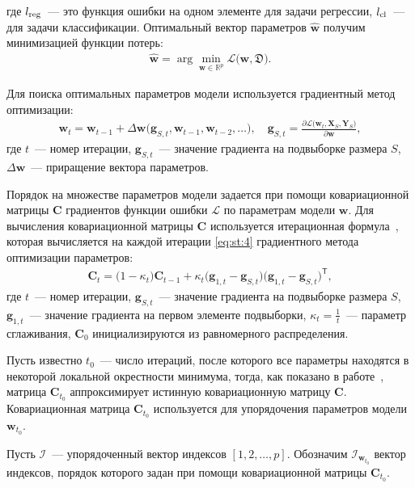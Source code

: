 где $l_{\text{\text{reg}}}$~--- это функция ошибки на одном элементе для задачи регрессии, $l_{\text{\text{cl}}}$~--- для задачи классификации.
Оптимальный вектор параметров $\hat{\textbf{w}}$ получим минимизацией функции потерь:
\[
\label{eq:st:0:1}
\begin{aligned}
\hat{\textbf{w}} = \arg \min_{\textbf{w}\in\mathbb{R}^{p}} \mathcal{L}\bigr(\textbf{w}, \mathfrak{D}\bigr).
\end{aligned}
\]

Для поиска оптимальных параметров модели используется градиентный метод оптимизации:
\[
\label{eq:st:4}
\begin{aligned}
\textbf{w}_{t} = \textbf{w}_{t-1} + \Delta\textbf{w}\bigr(\textbf{g}_{S,t}, \textbf{w}_{t-1}, \textbf{w}_{t-2}, \ldots\bigr), \quad \textbf{g}_{S,t}=\frac{\partial \mathcal{L}\bigr(\textbf{w}_{t}, \textbf{X}_{S}, \textbf{Y}_{S}\bigr)}{\partial \textbf{w}},
\end{aligned}
\]
где $t$~--- номер итерации, $\textbf{g}_{S,t}$~--- значение градиента на подвыборке размера $S$, $\Delta\textbf{w}$~--- приращение вектора параметров.
 
 
Порядок на множестве параметров модели задается при помощи ковариационной матрицы $\textbf{C}$ градиентов функции ошибки $\mathcal{L}$ по параметрам модели $\textbf{w}$. Для вычисления ковариационной матрицы $\textbf{C}$ используется итерационная формула~\cite{Chunyan2016}, которая вычисляется на каждой итерации \eqref{eq:st:4} градиентного метода оптимизации параметров:
\[
\label{eq:st:5}
\begin{aligned}
\textbf{C}_t = \bigr(1-\kappa_t\bigr)\textbf{C}_{t-1}+\kappa_t\bigr(\textbf{g}_{1,t}-\textbf{g}_{S,t}\bigr)\bigr(\textbf{g}_{1,t}-\textbf{g}_{S,t}\bigr)^{\mathsf{T}},
\end{aligned}
\]
 где $t$~--- номер итерации, $\textbf{g}_{S,t}$~--- значение градиента на подвыборке размера $S$, $\textbf{g}_{1,t}$~--- значение градиента на первом элементе подвыборки, $\kappa_t=\frac{1}{t}$~--- параметр сглаживания, $\textbf{C}_0$ инициализируются из равномерного распределения.
 
Пусть известно $t_0$~--- число итераций, после которого все параметры находятся в некоторой локальной окрестности минимума, тогда, как показано в работе~\cite{Chunyan2016}, матрица $\textbf{C}_{t_0}$ аппроксимирует истинную ковариационную матрицу $\textbf{C}$. Ковариационная матрица $\textbf{C}_{t_0}$ используется для упорядочения параметров модели $\textbf{w}_{t_0}$. 
 
Пусть $\mathcal{I}$~---  упорядоченный вектор индексов $[1, 2, \ldots, p]$. Обозначим $\mathcal{I}_{\textbf{w}_{t_0}}$ вектор индексов, порядок которого задан при помощи ковариационной матрицы $\textbf{C}_{t_0}$. 
 
